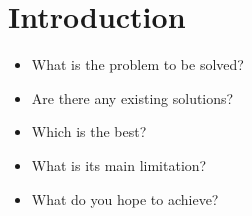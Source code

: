 \chapter{Introduction}\label{ch:introduction}
\begin{itemize}
    \item What is the problem to be solved?
    \item Are there any existing solutions?
    \item Which is the best?
    \item What is its main limitation?
    \item What do you hope to achieve?
\end{itemize}



